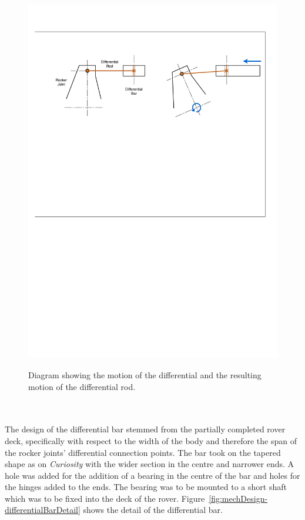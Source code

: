 \begin{figure}[h!]
{        \includegraphics[clip, trim=2cm 26cm 2cm 4cm, width=0.9\linewidth]{figures/mechDesign-differentialMotionSide.pdf}
      }
      \caption[Diagram showing the motion of the differential and the resulting motion of the differential rod.]{Diagram showing the motion of the differential and the resulting motion of the differential rod.}
      \label{fig:mechDesign-differentialMotion}
      \end{figure}
      
      
      \\\\
        The design of the differential bar stemmed from the partially completed rover deck, specifically with respect to the width of the body and therefore the span of the rocker joints' differential connection points. The bar took on the tapered shape as on \textit{Curiosity} with the wider section in the centre and narrower ends. A hole was added for the addition of a bearing in the centre of the bar and holes for the hinges added to the ends. The bearing was to be mounted to a short shaft which was to be fixed into the deck of the rover. Figure~\ref{fig:mechDesign-differentialBarDetail} shows the detail of the differential bar.
        
